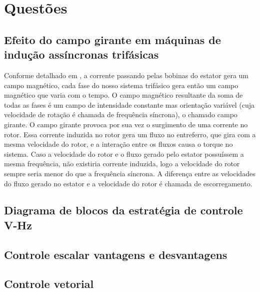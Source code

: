 \documentclass{article}
\begin{document}

\section{Questões}
\subsection{Efeito do campo girante em máquinas de indução assíncronas trifásicas}
Conforme detalhado em \cite{bb:learneng}, a corrente passando pelas bobinas do estator gera um campo magnético, cada fase do nosso sistema trifásico gera então um campo magnético que varia com o tempo. O campo magnético resultante da soma de todas as fases é um campo de intensidade constante mas orientação variável (cuja velocidade de rotação é chamada de frequência síncrona), o chamado campo girante. O campo girante provoca por sua vez o surgimento de uma corrente no rotor.
Essa corrente induzida no rotor gera um fluxo no entreferro, que gira com a mesma velocidade do rotor, e a interação entre os fluxos causa o torque no sistema. Caso a velocidade do rotor e o fluxo gerado pelo estator possuíssem a mesma frequência, não existiria corrente induzida, logo a velocidade do rotor sempre seria menor do que a frequência síncrona. A diferença entre as velocidades do fluxo gerado no estator e a velocidade do rotor é chamada de escorregamento.
\subsection{Diagrama de blocos da estratégia de controle V-Hz}
\subsection{Controle escalar vantagens e desvantagens}
\subsection{Controle vetorial}

\end{document}
